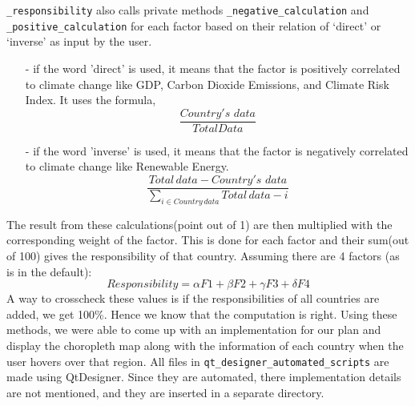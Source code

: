 \documentclass[fontsize=11pt]{article}
\begin{document}
    \texttt{\_responsibility} also calls private methods \texttt{\_negative\_calculation} and \texttt{\_positive\_calculation} for each factor based on
    their relation of ‘direct’ or ‘inverse’ as input by the user.\newline
    \begin{enumerate}
        \item [-] if the word 'direct' is used, it means that the factor is positively correlated to climate change like
        GDP, Carbon Dioxide Emissions, and Climate Risk Index. It uses the formula,
        \[
            \frac{Country's \, \, data}{Total Data}
        \]

        \item [-] if the word 'inverse' is used, it means that the factor is negatively correlated to climate change like
        Renewable Energy.
        \[
            \frac{Total \, data - Country's \, \, data}{\displaystyle\sum_{i \in Country \, data} Total \, data - i }
        \]
    \end{enumerate}
    The result from these calculations(point out of 1) are then multiplied with the corresponding weight of the factor.
    This is done for each factor and their sum(out of 100) gives the responsibility of that country. Assuming there are 4 factors (as is in the default):
    \[
        Responsibility = \alpha F1 + \beta F2 + \gamma F3 + \delta F4
    \]
    A way to crosscheck these values
    is if the responsibilities of all countries are added, we get 100\%. Hence we know that the computation is right.
    \newline
    Using these methods, we were able to come up with an implementation for our plan and display the
    choropleth map along with the information of each country when the user hovers over that region.\newline
    All files in \texttt{qt\_designer\_automated\_scripts} are made using QtDesigner. Since they are automated,
    there implementation details are not mentioned, and they are inserted in a separate directory.
    
\end{document}
